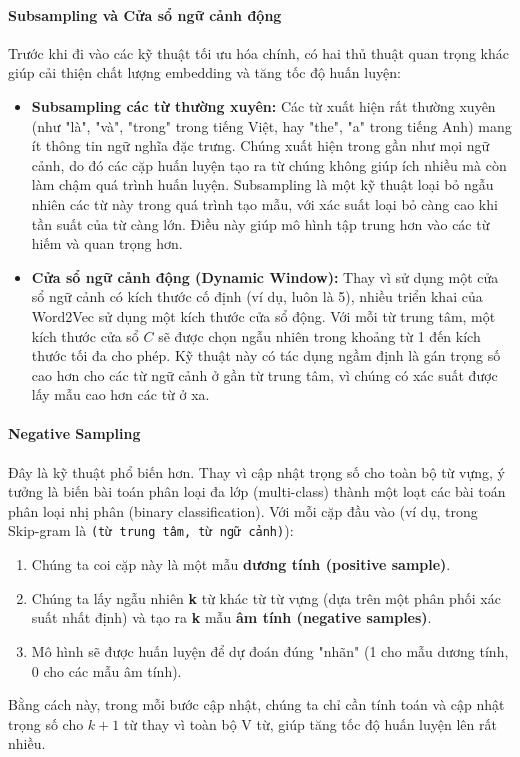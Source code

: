\paragraph{Subsampling và Cửa sổ ngữ cảnh động}
Trước khi đi vào các kỹ thuật tối ưu hóa chính, có hai thủ thuật quan trọng khác giúp cải thiện chất lượng embedding và tăng tốc độ huấn luyện:
\begin{itemize}
    \item \textbf{Subsampling các từ thường xuyên:} Các từ xuất hiện rất thường xuyên (như "là", "và", "trong" trong tiếng Việt, hay "the", "a" trong tiếng Anh) mang ít thông tin ngữ nghĩa đặc trưng. Chúng xuất hiện trong gần như mọi ngữ cảnh, do đó các cặp huấn luyện tạo ra từ chúng không giúp ích nhiều mà còn làm chậm quá trình huấn luyện. Subsampling là một kỹ thuật loại bỏ ngẫu nhiên các từ này trong quá trình tạo mẫu, với xác suất loại bỏ càng cao khi tần suất của từ càng lớn. Điều này giúp mô hình tập trung hơn vào các từ hiếm và quan trọng hơn.
    
    \item \textbf{Cửa sổ ngữ cảnh động (Dynamic Window):} Thay vì sử dụng một cửa sổ ngữ cảnh có kích thước cố định (ví dụ, luôn là 5), nhiều triển khai của Word2Vec sử dụng một kích thước cửa sổ động. Với mỗi từ trung tâm, một kích thước cửa sổ $C$ sẽ được chọn ngẫu nhiên trong khoảng từ 1 đến kích thước tối đa cho phép. Kỹ thuật này có tác dụng ngầm định là gán trọng số cao hơn cho các từ ngữ cảnh ở gần từ trung tâm, vì chúng có xác suất được lấy mẫu cao hơn các từ ở xa.
\end{itemize}

\paragraph{Negative Sampling}
Đây là kỹ thuật phổ biến hơn. Thay vì cập nhật trọng số cho toàn bộ từ vựng, ý tưởng là biến bài toán phân loại đa lớp (multi-class) thành một loạt các bài toán phân loại nhị phân (binary classification). Với mỗi cặp đầu vào (ví dụ, trong Skip-gram là \texttt{(từ trung tâm, từ ngữ cảnh)}):
\begin{enumerate}
    \item Chúng ta coi cặp này là một mẫu \textbf{dương tính (positive sample)}.
    \item Chúng ta lấy ngẫu nhiên \textbf{k} từ khác từ từ vựng (dựa trên một phân phối xác suất nhất định) và tạo ra \textbf{k} mẫu \textbf{âm tính (negative samples)}.
    \item Mô hình sẽ được huấn luyện để dự đoán đúng "nhãn" (1 cho mẫu dương tính, 0 cho các mẫu âm tính).
\end{enumerate}
Bằng cách này, trong mỗi bước cập nhật, chúng ta chỉ cần tính toán và cập nhật trọng số cho $k+1$ từ thay vì toàn bộ V từ, giúp tăng tốc độ huấn luyện lên rất nhiều.

